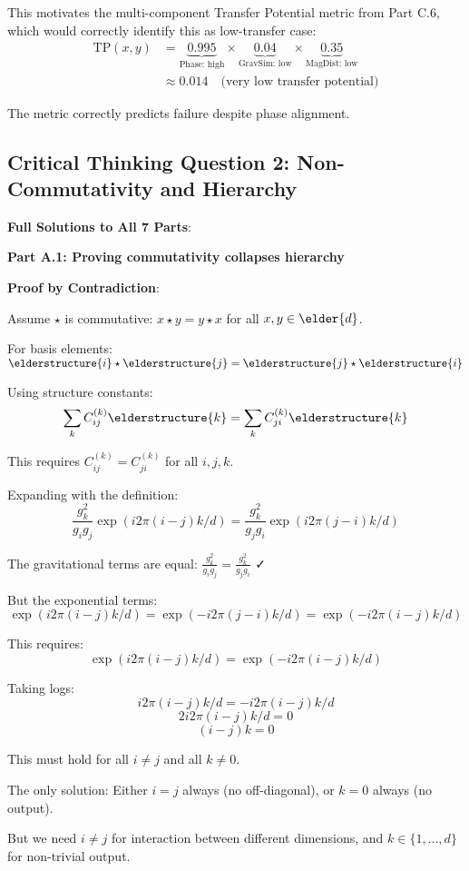 This motivates the multi-component Transfer Potential metric from Part C.6, which would correctly identify this as low-transfer case:
\begin{align}
\text{TP}(x,y) &= \underbrace{0.995}_{\text{Phase: high}} \times \underbrace{0.04}_{\text{GravSim: low}} \times \underbrace{0.35}_{\text{MagDist: low}} \\
&\approx 0.014 \quad \text{(very low transfer potential)}
\end{align}

The metric correctly predicts failure despite phase alignment.

\subsection*{Critical Thinking Question 2: Non-Commutativity and Hierarchy}

\textbf{Full Solutions to All 7 Parts}:

\textbf{Part A.1: Proving commutativity collapses hierarchy}

\textbf{Proof by Contradiction}:

Assume $\star$ is commutative: $x \star y = y \star x$ for all $x, y \in \elder{d}$.

For basis elements: $\elderstructure{i} \star \elderstructure{j} = \elderstructure{j} \star \elderstructure{i}$

Using structure constants:
$$\sum_{k} C_{ij}^{(k)} \elderstructure{k} = \sum_{k} C_{ji}^{(k)} \elderstructure{k}$$

This requires $C_{ij}^{(k)} = C_{ji}^{(k)}$ for all $i,j,k$.

Expanding with the definition:
$$\frac{g_k^2}{g_ig_j} \exp(i2\pi(i-j)k/d) = \frac{g_k^2}{g_jg_i} \exp(i2\pi(j-i)k/d)$$

The gravitational terms are equal: $\frac{g_k^2}{g_ig_j} = \frac{g_k^2}{g_jg_i}$ ✓

But the exponential terms:
$$\exp(i2\pi(i-j)k/d) = \exp(-i2\pi(j-i)k/d) = \exp(-i2\pi(i-j)k/d)$$

This requires:
$$\exp(i2\pi(i-j)k/d) = \exp(-i2\pi(i-j)k/d)$$

Taking logs:
$$i2\pi(i-j)k/d = -i2\pi(i-j)k/d$$
$$2i2\pi(i-j)k/d = 0$$
$$(i-j)k = 0$$

This must hold for all $i \neq j$ and all $k \neq 0$.

The only solution: Either $i = j$ always (no off-diagonal), or $k=0$ always (no output).

But we need $i \neq j$ for interaction between different dimensions, and $k \in \{1, \ldots, d\}$ for non-trivial output.

